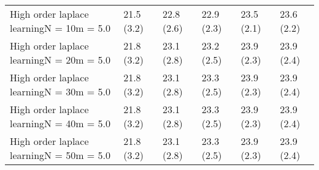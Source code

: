 \documentclass{article}
\begin{document}
\begin{table*}[t!]
\begin{center}
\begin{small}
\begin{sc}
\begin{tabular}{llllll}
High order laplace learningN = 10m = 5.0&21.5 (3.2)      &22.8 (2.6)      &22.9 (2.3)      &23.5 (2.1)      &23.6 (2.2)      \\
High order laplace learningN = 20m = 5.0&21.8 (3.2)      &23.1 (2.8)      &23.2 (2.5)      &23.9 (2.3)      &23.9 (2.4)      \\
High order laplace learningN = 30m = 5.0&21.8 (3.2)      &23.1 (2.8)      &23.3 (2.5)      &23.9 (2.3)      &23.9 (2.4)      \\
High order laplace learningN = 40m = 5.0&21.8 (3.2)      &23.1 (2.8)      &23.3 (2.5)      &23.9 (2.3)      &23.9 (2.4)      \\
High order laplace learningN = 50m = 5.0&21.8 (3.2)      &23.1 (2.8)      &23.3 (2.5)      &23.9 (2.3)      &23.9 (2.4)      \\
\bottomrule
\end{tabular}
\end{sc}
\end{small}
\end{center}
\vskip -0.1in
\end{table*}
\end{document}
